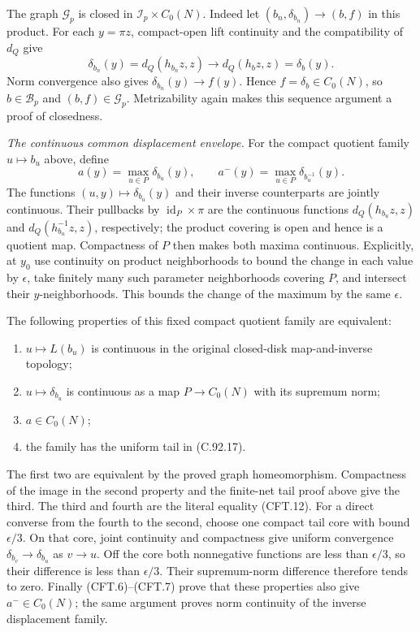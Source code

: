 \documentclass[11pt,a4paper]{article}
\DeclareMathOperator{\id}{id}\DeclareMathOperator{\im}{im}
\begin{document}
The graph $\mathscr G_p$ is closed in
$\mathscr I_p\times C_0(N)$. Indeed let
$(b_n,\delta_{b_n})\to(b,f)$ in this product. For each
$y=\pi z$, compact-open lift continuity and the compatibility
of $d_Q$ give
\[
  \delta_{b_n}(y)=d_Q(h_{b_n}z,z)
                \longrightarrow d_Q(h_bz,z)=\delta_b(y).
                                                               \tag{CFT.11}
\]
Norm convergence also gives $\delta_{b_n}(y)\to f(y)$.
Hence $f=\delta_b\in C_0(N)$, so $b\in\mathscr B_p$ and
$(b,f)\in\mathscr G_p$. Metrizability again makes this
sequence argument a proof of closedness.

\emph{The continuous common displacement envelope.}
For the compact quotient family $u\mapsto b_u$ above, define
\[
 a(y)=\max_{u\in P}\delta_{b_u}(y),\qquad
 a^-(y)=\max_{u\in P}\delta_{b_u^{-1}}(y).
                                                               \tag{CFT.12}
\]
The functions $(u,y)\mapsto\delta_{b_u}(y)$ and their inverse
counterparts are jointly continuous. Their pullbacks by
$\id_P\times\pi$ are the continuous functions
$d_Q(h_{b_u}z,z)$ and $d_Q(h_{b_u}^{-1}z,z)$, respectively;
the product covering is open and hence is a quotient map.
Compactness of $P$ then makes both maxima continuous.
Explicitly, at $y_0$ use continuity on product neighborhoods
to bound the change in each value by $\epsilon$, take finitely
many such parameter neighborhoods covering $P$, and intersect
their $y$-neighborhoods. This bounds the change of the maximum
by the same $\epsilon$.

The following properties of this fixed compact quotient
family are equivalent:
\begin{enumerate}
\item $u\mapsto L(b_u)$ is continuous in the original
      closed-disk map-and-inverse topology;
\item $u\mapsto\delta_{b_u}$ is continuous as a map
      $P\to C_0(N)$ with its supremum norm;
\item $a\in C_0(N)$;
\item the family has the uniform tail in (C.92.17).
\end{enumerate}
The first two are equivalent by the proved graph
homeomorphism. Compactness of the image in the second
property and the finite-net tail proof above give the third.
The third and fourth are the literal equality (CFT.12).
For a direct converse from the fourth to the second, choose
one compact tail core with bound $\epsilon/3$. On that core,
joint continuity and compactness give uniform convergence
$\delta_{b_v}\to\delta_{b_u}$ as $v\to u$. Off the core both
nonnegative functions are less than $\epsilon/3$, so their
difference is less than $\epsilon/3$. Their supremum-norm
difference therefore tends to zero. Finally (CFT.6)--(CFT.7)
prove that these properties also give $a^-\in C_0(N)$;
the same argument proves norm continuity of the inverse
displacement family.
\end{document}

